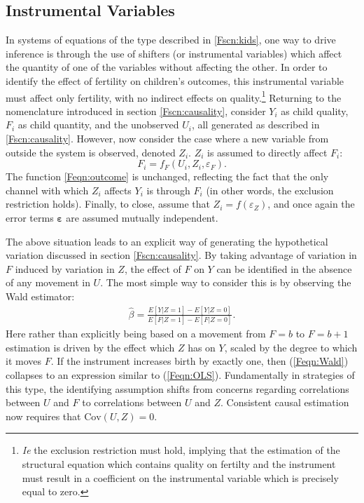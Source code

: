 \documentclass{article}
\newcommand{\Cov}{\mathrm{Cov}}
\begin{document}
\begin{spacing}{1.4}
\subsection{Instrumental Variables}
\label{Fsscn:kidIV}
In systems of equations of the type described in \ref{Fscn:kids}, one way to 
drive inference is through the
use of shifters (or instrumental variables) which affect the quantity of one of
the variables without affecting the other.  In order to identify the effect of 
fertility on children's outcomes, this instrumental variable must affect only 
fertility, with no indirect effects on quality.\footnote{\emph{Ie} the exclusion 
restriction must hold, implying that the estimation of the structural equation 
which contains quality on fertilty and the instrument must result in a 
coefficient on the instrumental variable which is precisely equal to zero.}
Returning to the nomenclature introduced in section \ref{Fscn:causality},
consider $Y_i$ as child quality, $F_i$ as child quantity, and the unobserved
$U_i$, all generated as described in \ref{Fscn:causality}.  However, now consider 
the case where a new variable from outside the system is observed, denoted 
$Z_i$.  $Z_i$ is assumed to directly affect $F_i$:
\[
F_i = f_F(U_i,Z_i,\varepsilon_F).
\]
The function \ref{Feqn:outcome} is unchanged, reflecting the fact that the only
channel with which $Z_i$ affects $Y_i$ is through $F_i$ (in other words, the 
exclusion restriction holds). Finally, to close, assume that 
$Z_i=f(\varepsilon_Z)$, and once again the error terms $\bm{\varepsilon}$ are 
assumed mutually independent.

The above situation leads to an explicit way of generating the hypothetical 
variation discussed in section \ref{Fscn:causality}.  By taking advantage of 
variation in $F$ induced by variation in $Z$, the effect of $F$ on $Y$ can
be identified in the absence of any movement in $U$.  The most simple way to
consider this is by observing the Wald estimator:
\begin{eqnarray}
\label{Feqn:Wald}
\hat\beta = \frac{E[Y|Z=1]-E[Y|Z=0]}{E[F|Z=1]-E[F|Z=0]}.
\end{eqnarray}
Here rather than explicitly being based on a movement from $F=b$ to $F=b+1$
estimation is driven by the effect which $Z$ has on $Y$, scaled by the
degree to which it moves $F$.  If the instrument increases birth by exactly
one, then (\ref{Feqn:Wald}) collapses to an expression similar to 
(\ref{Feqn:OLS}).  Fundamentally in strategies of this type, the identifying
assumption shifts from concerns regarding correlations between $U$ and $F$
to correlations between $U$ and $Z$.  Consistent causal estimation now 
requires that $\Cov(U,Z)=0$.


\end{spacing}
\end{document}
